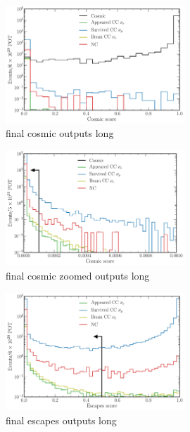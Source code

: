 \begin{figure} %
    \includegraphics[width=0.6\textwidth]{diagrams/7-cvn/chipsnet/final_cosmic_outputs.pdf}
    \caption[final cosmic outputs short]
    {final cosmic outputs long}
    \label{fig:final_cosmic_outputs}
\end{figure}

\begin{figure} %
    \includegraphics[width=0.6\textwidth]{diagrams/7-cvn/chipsnet/final_cosmic_zoomed_outputs.pdf}
    \caption[final cosmic zoomed outputs short]
    {final cosmic zoomed outputs long}
    \label{fig:final_cosmic_zoomed_outputs}
\end{figure}

\begin{figure} %
    \includegraphics[width=0.6\textwidth]{diagrams/7-cvn/chipsnet/final_escapes_outputs.pdf}
    \caption[final escapes outputs short]
    {final escapes outputs long}
    \label{fig:final_escapes_outputs}
\end{figure}

